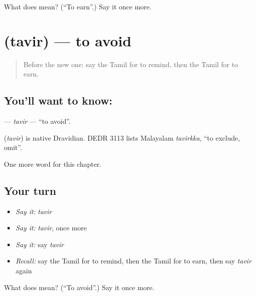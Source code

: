 \begin{tcolorbox}[breakable,colback=teal!4,colframe=teal!35!black,title={Before you move on}]
What does  mean? (\textquotedblleft{}To earn\textquotedblright{}.) Say it once more.
\end{tcolorbox}
\section[\texorpdfstring{\ta{தவிர்} (tavir)}{தவிர் (tavir)}]{ (tavir) — to avoid}

\label{lesson:TA-C197-tavir}



\begin{quote}
Before the new one: say the Tamil for to remind, then the Tamil for to earn.
\end{quote}

\subsection*{You'll want to know: }
\textbf{} — \emph{tavir} — \textquotedblleft{}to avoid\textquotedblright{}.

\begin{cousinweb}
\textbf{} (\emph{tavir}) is native Dravidian. DEDR 3113 lists Malayalam \emph{tavirkka}, \textquotedblleft{}to exclude, omit\textquotedblright{}.
\end{cousinweb}

\begin{grammarlens}[title={What you've built}]
One more word for this chapter.
\end{grammarlens}

\subsection*{Your turn}
\begin{itemize}
\raggedright
  \item \emph{Say it:} \emph{tavir}
  \item \emph{Say it:} \emph{tavir}, once more
  \item \emph{Say it:} say \emph{tavir}
  \item \emph{Recall:} say the Tamil for to remind, then the Tamil for to earn, then say \emph{tavir} again
\end{itemize}

\begin{tcolorbox}[breakable,colback=teal!4,colframe=teal!35!black,title={Before you move on}]
What does  mean? (\textquotedblleft{}To avoid\textquotedblright{}.) Say it once more.
\end{tcolorbox}
